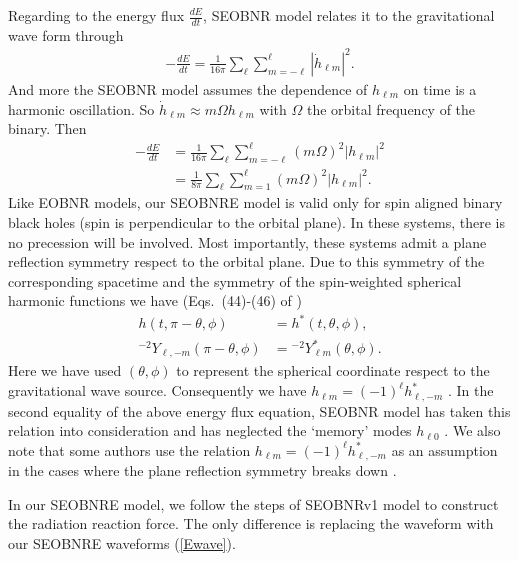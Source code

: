 \documentclass[prd,aps,a4paper,superscriptaddress,twocolumn,footinbib,showpacs]{revtex4}
\begin{document}
Regarding to the energy flux $\frac{dE}{dt}$, SEOBNR model relates it to the gravitational wave form through \cite{PhysRevD.83.064003}
\begin{align}
-\frac{dE}{dt}=\frac{1}{16\pi}\sum_\ell\sum_{m=-\ell}^{\ell}|\dot{h}_{\ell m}|^2.
\end{align}
And more the SEOBNR model assumes the dependence of $h_{\ell m}$ on time is a harmonic oscillation. So $\dot{h}_{\ell m}\approx m\Omega h_{\ell m}$ with $\Omega$ the orbital frequency of the binary. Then
\begin{align}
-\frac{dE}{dt}&=\frac{1}{16\pi}\sum_\ell\sum_{m=-\ell}^{\ell}(m\Omega)^2|h_{\ell m}|^2\\
&=\frac{1}{8\pi}\sum_\ell\sum_{m=1}^{\ell}(m\Omega)^2|h_{\ell m}|^2.\label{waveformflux}
\end{align}
Like EOBNR models, our SEOBNRE model is valid only for spin aligned binary black holes (spin is perpendicular to the orbital plane). In these systems, there is no precession will be involved. Most importantly, these systems admit a plane reflection symmetry respect to the orbital plane. Due to this symmetry of the corresponding spacetime and the symmetry of the spin-weighted spherical harmonic functions we have (Eqs.~(44)-(46) of \cite{PhysRevD.77.024027})
\begin{align}
h(t,\pi-\theta,\phi)&=h^*(t,\theta,\phi),\\
{}^{-2}Y_{\ell,-m}(\pi-\theta,\phi)&={}^{-2}Y^*_{\ell m}(\theta,\phi).
\end{align}
Here we have used $(\theta,\phi)$ to represent the spherical coordinate respect to the gravitational wave source. Consequently we have $h_{\ell m}=(-1)^\ell h_{\ell,-m}^*$ \cite{PhysRevD.84.124052}. In the second equality of the above energy flux equation, SEOBNR model has taken this relation into consideration and has neglected the `memory' modes $h_{\ell 0}$ \cite{Cao16,PhysRevD.95.084048}. We also note that some authors use the relation $h_{\ell m}=(-1)^\ell h_{\ell,-m}^*$ as an assumption in the cases where the plane reflection symmetry breaks down \cite{PhysRevD.89.061502,pan2014inspiral,PhysRevX.6.041014}.

In our SEOBNRE model, we follow the steps of SEOBNRv1 model to construct the radiation reaction force. The only difference is replacing the waveform with our SEOBNRE waveforms (\ref{Ewave}).
\end{document}
